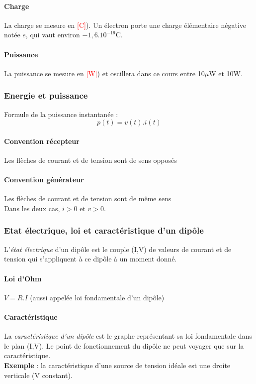 \documentclass[a4paper]{article}
\begin{document}
    \paragraph{Charge} La charge se mesure en \textcolor{red}{[C]}). Un électron
    porte une charge élémentaire négative notée $e$, qui vaut environ $-1,6.10^{-19}$C.

    \paragraph{Puissance} La puissance se mesure en \textcolor{red}{[W]}) et
    oscillera dans ce cours entre 10$\mu$W et 10W.

    \subsubsection{Energie et puissance}
    Formule de la puissance instantanée : $$ p(t) = v(t).i(t) $$

    \paragraph{Convention récepteur} Les flèches de courant et de tension sont
    de sens opposés

    \paragraph{Convention générateur} Les flèches de courant et de tension sont
    de même sens\\

    Dans les deux cas, $i>0$ et $v>0$.

    \subsubsection{Etat électrique, loi et caractéristique d'un dipôle}
    L'\textit{état électrique} d'un dipôle est le couple (I,V) de valeurs de
    courant et de tension qui s'appliquent à ce dipôle à un moment donné.

    \paragraph{Loi d'Ohm} $V = R.I$ (aussi appelée loi fondamentale d'un dipôle)

    \paragraph{Caractéristique} La \textit{caractéristique d'un dipôle} est le
    graphe représentant sa loi fondamentale dans le plan (I,V). Le point de fonctionnement
    du dipôle ne peut voyager que sur la caractéristique. \\
    \textbf{Exemple} : la caractéristique d'une source de tension idéale est une
    droite verticale (V constant).
\end{document}
